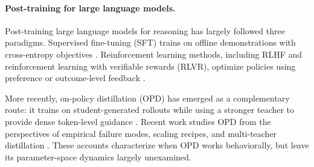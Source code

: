 \documentclass{llmxive}
\begin{document}



\paragraph{Post-training for large language models.} Post-training large language models for reasoning has largely followed
three paradigms. Supervised fine-tuning (SFT) trains on offline
demonstrations with cross-entropy objectives
\cite{howard2018universallanguagemodelfinetuning,
dodge2020finetuningpretrainedlanguagemodels,
wei2022finetunedlanguagemodelszeroshot}. Reinforcement learning methods,
including RLHF and reinforcement learning with verifiable rewards (RLVR),
optimize policies using preference or outcome-level feedback
\cite{ziegler2020finetuninglanguagemodelshuman,
ouyang2022traininglanguagemodelsfollow,
shao2024deepseekmathpushinglimitsmathematical, guo2025deepseek}. 

More recently, on-policy distillation (OPD) has emerged
as a complementary route: it trains on student-generated rollouts while
using a stronger teacher to provide dense token-level guidance
\cite{lu2025onpolicydistillation,
song2026surveyonpolicydistillationlarge}. Recent work studies OPD from
the perspectives of empirical failure modes, scaling recipes, and
multi-teacher distillation
\cite{fu2026revisitingonpolicydistillationempirical,
li2026rethinkingonpolicydistillationlarge,
deepseekai2026deepseekv4,
yang2025qwen3technicalreport}. These accounts characterize when OPD works
behaviorally, but leave its parameter-space dynamics largely unexamined.
\end{document}
